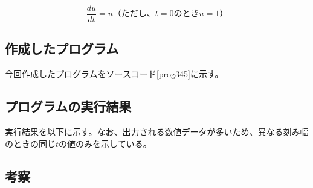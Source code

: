 \documentclass[10pt,titlepage]{jsarticle}
\begin{document}
\begin{equation}
\label{kadai345}
	\frac{du}{dt} = u （ただし、t=0のときu=1）
\end{equation}

\subsection{作成したプログラム}
今回作成したプログラムをソースコード\ref{prog345}に示す。




\subsection{プログラムの実行結果}
実行結果を以下に示す。なお、出力される数値データが多いため、異なる刻み幅のときの同じ$t$の値のみを示している。
\begin{oframed}
\end{oframed}


\subsection{考察}
\end{document}
